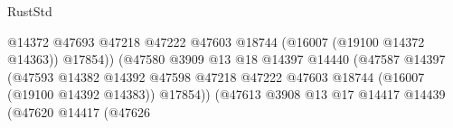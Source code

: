 \begin{lexlean}{RustStd}
\begin{coremodule}
                                                                  @14372
                                                                  @47693
                                                                  @47218
                                                                  @47222
                                                                  @47603
                                                                  @18744
                                                                  (@16007 (@19100 @14372 @14363))
                                                                  @17854))
                                                              (@47580
                                                                @3909
                                                                @13
                                                                @18
                                                                @14397
                                                                @14440
                                                                (@47587
                                                                  @14397
                                                                  (@47593
                                                                    @14382
                                                                    @14392
                                                                    @47598
                                                                    @47218
                                                                    @47222
                                                                    @47603
                                                                    @18744
                                                                    (@16007 (@19100 @14392 @14383))
                                                                    @17854))
                                                                (@47613
                                                                  @3908
                                                                  @13
                                                                  @17
                                                                  @14417
                                                                  @14439
                                                                  (@47620
                                                                    @14417
                                                                    (@47626

\end{coremodule}
\end{lexlean}
